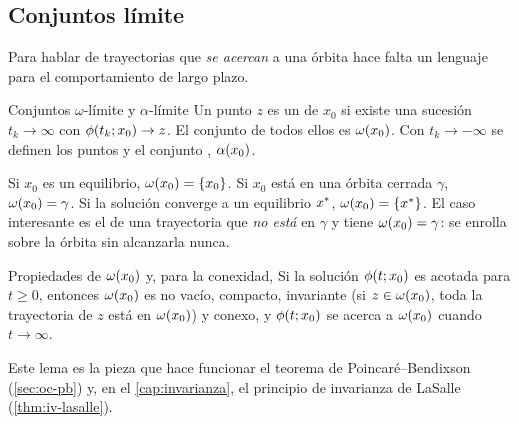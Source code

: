 \subsection{Conjuntos límite}

Para hablar de trayectorias que \emph{se acercan} a una órbita hace falta un lenguaje para el comportamiento de largo plazo.

\begin{definicion}[label=def:oc-omega]{Conjuntos $\omega$-límite y $\alpha$-límite}
Un punto $z$ es un  de $x_0$ si existe una sucesión $t_k\to\infty$ con $\phi(t_k;x_0)\to z$. El conjunto de todos ellos es $\omega(x_0)$. Con $t_k\to-\infty$ se definen los puntos y el conjunto , $\alpha(x_0)$.
\end{definicion}

Si $x_0$ es un equilibrio, $\omega(x_0)=\{x_0\}$. Si $x_0$ está en una órbita cerrada $\gamma$, $\omega(x_0)=\gamma$. Si la solución converge a un equilibrio $x^{*}$, $\omega(x_0)=\{x^{*}\}$. El caso interesante es el de una trayectoria que \emph{no está} en $\gamma$ y tiene $\omega(x_0)=\gamma$: se enrolla sobre la órbita sin alcanzarla nunca.

\begin{lema}[label=lem:oc-omega]{Propiedades de $\omega(x_0)$ \citep[Lema~4.1]{Kha02} y, para la conexidad, \citep[\S3.2, Teorema~2]{Per01}}
Si la solución $\phi(t;x_0)$ es acotada para $t\ge0$, entonces $\omega(x_0)$ es no vacío, compacto, invariante (si $z\in\omega(x_0)$, toda la trayectoria de $z$ está en $\omega(x_0)$) y conexo, y $\phi(t;x_0)$ se acerca a $\omega(x_0)$ cuando $t\to\infty$.
\end{lema}

Este lema es la pieza que hace funcionar el teorema de Poincaré--Bendixson (\cref{sec:oc-pb}) y, en el \cref{cap:invarianza}, el principio de invarianza de LaSalle (\cref{thm:iv-lasalle}).
